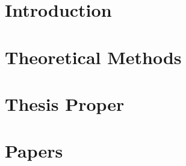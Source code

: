 \documentclass[oneside]{bThesis} %
\author{J\'on Bergmann Maronsson}
\title{\pending}
\begin{document}


\part{Introduction}
\label{part:introduction}

\part{Theoretical Methods}
\label{part:theory}

\part{Thesis Proper \pending}
\label{part:thesis}






\newpage
{}


\part{Papers}
\label{part:papers}



%
%
%
\end{document}
